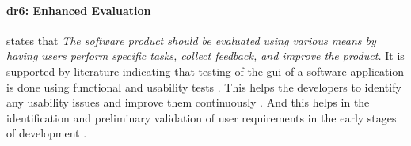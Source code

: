 
\paragraph{\ac{dr}6: Enhanced Evaluation} states that \textit{The software product should be evaluated using various means by having users perform specific tasks, collect feedback, and improve the product.} 
It is supported by literature indicating that testing of the \ac{gui} of a software application is done using functional and usability tests \cite{misc:usability:tasks}. 
This helps the developers to identify any usability issues \cite{article:tbup:kari} and improve them continuously \cite{article:prototyping:gould}.
And this helps in the identification and preliminary validation of user requirements in the early stages of development \cite{article:prototyping:weichbroth}. 


